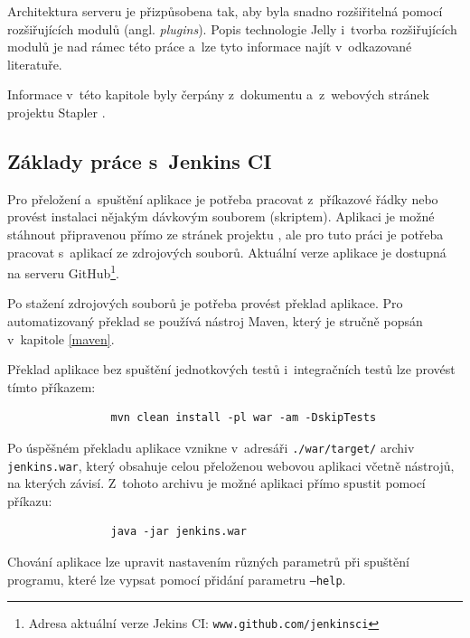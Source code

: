             Architektura serveru je přizpůsobena tak, aby byla snadno rozšiřitelná
            pomocí rozšiřujících modulů (angl. \emph{plugins}). Popis technologie Jelly
            i~tvorba rozšiřujících modulů je nad rámec této práce a~lze tyto informace
            najít v~odkazované literatuře.
        
            Informace v~této kapitole byly čerpány z~dokumentu \cite{architectureOverview}
            a~z~webových stránek projektu Stapler \cite{staplerWeb}.

        \subsection{Základy práce s~Jenkins CI} \label{jenkinsUsage}
            Pro přeložení a~spuštění aplikace je potřeba pracovat z~příkazové řádky nebo provést instalaci nějakým dávkovým souborem (skriptem).
            Aplikaci je možné stáhnout připravenou přímo ze stránek projektu \cite{jenkinsWeb}, ale pro tuto práci je potřeba 
            pracovat s~aplikací ze zdrojových souborů. Aktuální verze aplikace je dostupná na serveru 
            GitHub\footnote{Adresa aktuální verze Jekins CI: \texttt{www.github.com/jenkinsci}}.

            Po stažení zdrojových souborů je potřeba provést překlad aplikace. Pro automatizovaný 
            překlad se používá nástroj Maven, který je stručně popsán v~kapitole \ref{maven}. 
            
            Překlad aplikace bez spuštění jednotkových testů i~integračních testů lze provést tímto příkazem:
            \begin{verbatim}
                mvn clean install -pl war -am -DskipTests
            \end{verbatim}
            
            \medskip
            Po úspěšném překladu aplikace vznikne v~adresáři \texttt{./war/target/} archiv \texttt{jenkins.war}, 
            který obsahuje celou přeloženou webovou aplikaci včetně nástrojů, na 
            kterých závisí. Z~tohoto archivu je možné aplikaci přímo spustit pomocí příkazu:

            \begin{verbatim}
                java -jar jenkins.war
            \end{verbatim}
            Chování aplikace lze upravit nastavením různých parametrů při spuštění programu, 
            které lze vypsat pomocí přidání parametru \texttt{--help}.

